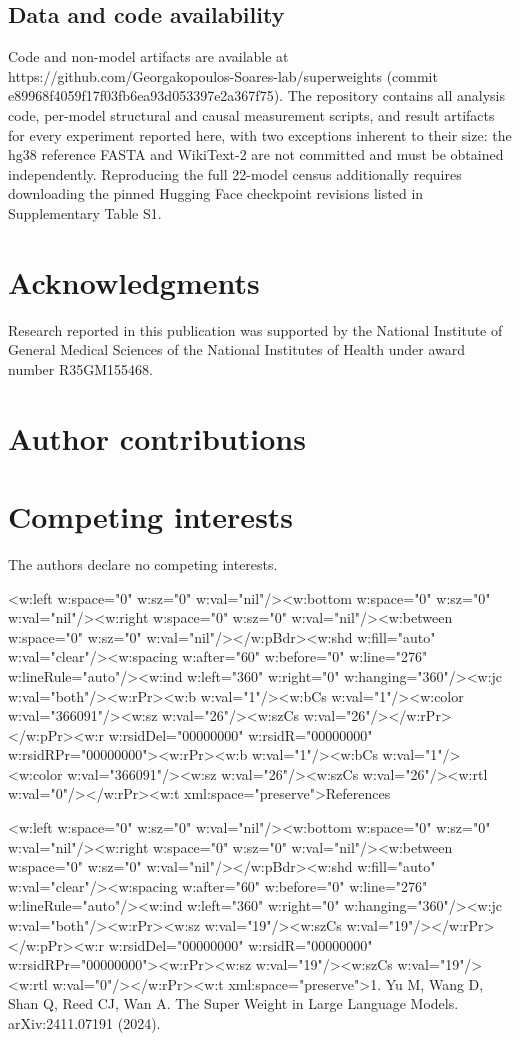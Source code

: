 \documentclass[11pt]{article}
\begin{document}
\subsection*{Data and code availability}
Code and non-model artifacts are available at https://github.com/Georgakopoulos-Soares-lab/superweights (commit e89968f4059f17f03fb6ea93d053397e2a367f75). The repository contains all analysis code, per-model structural and causal measurement scripts, and result artifacts for every experiment reported here, with two exceptions inherent to their size: the hg38 reference FASTA and WikiText-2 are not committed and must be obtained independently. Reproducing the full 22-model census additionally requires downloading the pinned Hugging Face checkpoint revisions listed in Supplementary Table S1.

\section*{Acknowledgments}
Research reported in this publication was supported by the National Institute of General Medical Sciences of the National Institutes of Health under award number R35GM155468.

\section*{Author contributions}
\section*{Competing interests}
The authors declare no competing interests.

<w:left w:space="0" w:sz="0" w:val="nil"/><w:bottom w:space="0" w:sz="0" w:val="nil"/><w:right w:space="0" w:sz="0" w:val="nil"/><w:between w:space="0" w:sz="0" w:val="nil"/></w:pBdr><w:shd w:fill="auto" w:val="clear"/><w:spacing w:after="60" w:before="0" w:line="276" w:lineRule="auto"/><w:ind w:left="360" w:right="0" w:hanging="360"/><w:jc w:val="both"/><w:rPr><w:b w:val="1"/><w:bCs w:val="1"/><w:color w:val="366091"/><w:sz w:val="26"/><w:szCs w:val="26"/></w:rPr></w:pPr><w:r w:rsidDel="00000000" w:rsidR="00000000" w:rsidRPr="00000000"><w:rPr><w:b w:val="1"/><w:bCs w:val="1"/><w:color w:val="366091"/><w:sz w:val="26"/><w:szCs w:val="26"/><w:rtl w:val="0"/></w:rPr><w:t xml:space="preserve">References

<w:left w:space="0" w:sz="0" w:val="nil"/><w:bottom w:space="0" w:sz="0" w:val="nil"/><w:right w:space="0" w:sz="0" w:val="nil"/><w:between w:space="0" w:sz="0" w:val="nil"/></w:pBdr><w:shd w:fill="auto" w:val="clear"/><w:spacing w:after="60" w:before="0" w:line="276" w:lineRule="auto"/><w:ind w:left="360" w:right="0" w:hanging="360"/><w:jc w:val="both"/><w:rPr><w:sz w:val="19"/><w:szCs w:val="19"/></w:rPr></w:pPr><w:r w:rsidDel="00000000" w:rsidR="00000000" w:rsidRPr="00000000"><w:rPr><w:sz w:val="19"/><w:szCs w:val="19"/><w:rtl w:val="0"/></w:rPr><w:t xml:space="preserve">1. Yu M, Wang D, Shan Q, Reed CJ, Wan A. The Super Weight in Large Language Models. arXiv:2411.07191 (2024).
\end{document}
